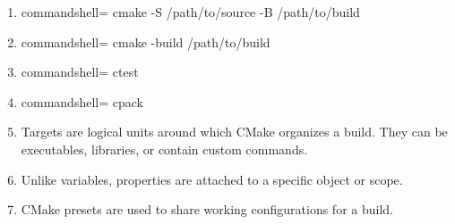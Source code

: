 

\begin{enumerate}
\item 
\begin{tcblisting}{commandshell={}}
cmake -S /path/to/source -B /path/to/build
\end{tcblisting}

\item 
\begin{tcblisting}{commandshell={}}
cmake -build /path/to/build
\end{tcblisting}

\item 
\begin{tcblisting}{commandshell={}}
ctest
\end{tcblisting}

\item 
\begin{tcblisting}{commandshell={}}
cpack
\end{tcblisting}

\item 
Targets are logical units around which CMake organizes a build. They can be executables, libraries, or contain custom commands.

\item 
Unlike variables, properties are attached to a specific object or scope.

\item 
CMake presets are used to share working configurations for a build.
\end{enumerate}